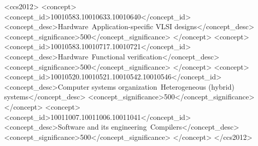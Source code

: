 \documentclass{acmart}
\begin{document}
\begin{CCSXML}
<ccs2012>
   <concept>
       <concept_id>10010583.10010633.10010640</concept_id>
       <concept_desc>Hardware~Application-specific VLSI designs</concept_desc>
       <concept_significance>500</concept_significance>
       </concept>
   <concept>
       <concept_id>10010583.10010717.10010721</concept_id>
       <concept_desc>Hardware~Functional verification</concept_desc>
       <concept_significance>500</concept_significance>
       </concept>
   <concept>
       <concept_id>10010520.10010521.10010542.10010546</concept_id>
       <concept_desc>Computer systems organization~Heterogeneous (hybrid) systems</concept_desc>
       <concept_significance>500</concept_significance>
       </concept>
   <concept>
       <concept_id>10011007.10011006.10011041</concept_id>
       <concept_desc>Software and its engineering~Compilers</concept_desc>
       <concept_significance>500</concept_significance>
       </concept>
 </ccs2012>
\end{CCSXML}








\begin{abstract}

\end{abstract}

\maketitle











\end{document}
